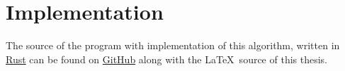 \section{Implementation}\label{implementation}
The source of the program with implementation of this algorithm, written in 
\href{https://www.rust-lang.org/}{Rust} can be found 
on
\href{https://github.com/Sooyka/praca_magisterska_orbifoldy}{GitHub} 
along with the \LaTeX\ source of 
this thesis.





